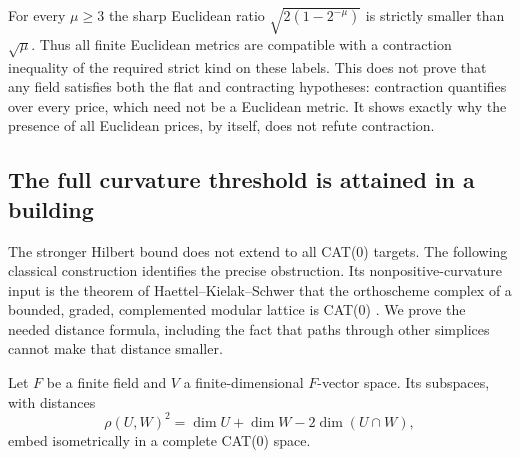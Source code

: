 For every $\mu\geq3$ the sharp Euclidean ratio
$\sqrt{2(1-2^{-\mu})}$ is strictly smaller than $\sqrt\mu$.
Thus all finite Euclidean metrics are compatible with a
contraction inequality of the required strict kind on these
labels.  This does not prove that any field satisfies both
the flat and contracting hypotheses: contraction quantifies
over every price, which need not be a Euclidean metric.
It shows exactly why the presence of all Euclidean prices,
by itself, does not refute contraction.

\subsection{The full curvature threshold is attained in a building}

The stronger Hilbert bound does not extend to all CAT(0) targets.
The following classical construction identifies the precise obstruction.
Its nonpositive-curvature input is the theorem of
Haettel--Kielak--Schwer that the orthoscheme complex of a bounded,
graded, complemented modular lattice is CAT(0)
\cite[Theorem~5.6, pp.~25--26]{HKS2016}.
We prove the needed distance formula, including the fact that paths
through other simplices cannot make that distance smaller.

\begin{lemma}
\label{lem:subspace-cat0}
Let $F$ be a finite field and $V$ a finite-dimensional $F$-vector
space. Its subspaces, with distances
\[
 \rho(U,W)^2=\dim U+\dim W-2\dim(U\cap W),
\]
embed isometrically in a complete CAT(0) space.
\end{lemma}


